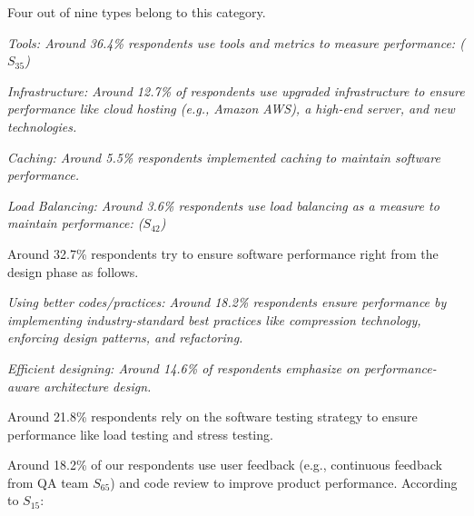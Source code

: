\begin{inparaenum}[(1)]
\item {} Four out of nine types belong to this category.
\begin{inparaenum}%
    \item \it{Tools}: Around 36.4\% respondents use tools and metrics to
    measure performance:  ($S_{35}$)
    \item \it{Infrastructure}: Around 12.7\% of respondents use upgraded
    infrastructure to ensure performance like cloud
    hosting (e.g., Amazon AWS), a high-end server, and new technologies.
    \item \it{Caching}: Around 5.5\% respondents implemented caching to maintain
    software performance.
    \item \it{Load Balancing}: Around 3.6\% respondents use load
    balancing as a measure to maintain performance:
    ($S_{42}$)
\end{inparaenum}
 
\item {}  Around 32.7\% respondents try to ensure software performance right from the design phase as follows.
\begin{inparaenum}%
    \item \it{Using better codes/practices}: Around 18.2\% respondents ensure performance by
    implementing industry-standard best practices like compression
    technology, enforcing design patterns, and refactoring.
    \item \it{Efficient designing}: Around 14.6\% of respondents emphasize on
    performance-aware architecture design.
\end{inparaenum}

\item {} Around 21.8\% respondents rely on the software testing strategy to ensure performance like load testing and stress testing.

\item {} Around 18.2\% of our respondents use user feedback (e.g., continuous feedback from QA team $S_{65}$) 
and code review to improve product performance. According to $S_{15}$: 
\end{inparaenum}
